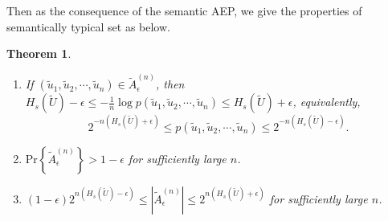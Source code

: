 \documentclass[12pt, draftclsnofoot,onecolumn]{IEEEtran}
\newtheorem{theorem}{\bf{Theorem}}
\begin{document}
Then as the consequence of the semantic AEP, we give the properties of semantically typical set as below.
\begin{theorem}\label{theorem8}
\text{ }
\begin{enumerate}[(1)]
    \item If $\left(\tilde{u}_1,\tilde{u}_2,\cdots,\tilde{u}_n\right)\in \tilde{A}_{\epsilon}^{(n)}$, then $H_s(\tilde{U})-\epsilon \leq -\frac{1}{n}\log p\left(\tilde{u}_1,\tilde{u}_2,\cdots,\tilde{u}_n\right) \leq H_s(\tilde{U})+\epsilon$, equivalently,
        \begin{equation}\label{SAEPinequality}
        2^{-n\left(H_s(\tilde{U})+\epsilon\right)}\leq p\left(\tilde{u}_1,\tilde{u}_2,\cdots,\tilde{u}_n\right) \leq 2^{-n\left(H_s(\tilde{U})-\epsilon\right)}.
        \end{equation}
    \item $\text{Pr}\left\{\tilde{A}_{\epsilon}^{(n)}\right\}>1-\epsilon$ for sufficiently large $n$.
    \item $\left(1-\epsilon\right) 2^{n\left(H_s(\tilde{U})-\epsilon\right)}\leq\left|\tilde{A}_{\epsilon}^{(n)}\right| \leq 2^{n\left(H_s(\tilde{U})+\epsilon\right)}$ for sufficiently large $n$.
\end{enumerate}
\end{theorem}
\end{document}
